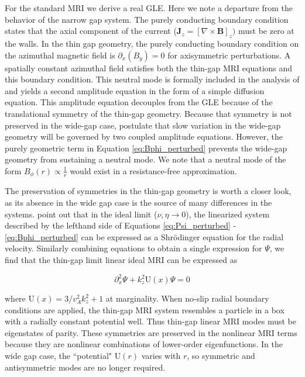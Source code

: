 \documentclass{emulateapj}
\newcommand{\beq}{\begin{equation}}
\newcommand{\eeq}{\end{equation}}
\newcommand{\citei}[1]{\citeauthor{#1} \citeyear{#1}}
\begin{document}
For the standard MRI we derive a real GLE. Here we note a departure from the behavior of the narrow gap system. The purely conducting boundary condition states that the axial component of the current ($\mathbf{J}_z = [\nabla \times \mathbf{B}]_z)$ must be zero at the walls. In the thin gap geometry, the purely conducting boundary condition on the azimuthal magnetic field is $\partial_x(B_y) = 0$ for axisymmetric perturbations. A spatially constant azimuthal field satisfies both the thin-gap MRI equations and this boundary condition. This neutral mode is formally included in the analysis of \citei{Umurhan:2007hs} and yields a second amplitude equation in the form of a simple diffusion equation. This amplitude equation decouples from the GLE because of the translational symmetry of the thin-gap geometry. Because that symmetry is not preserved in the wide-gap case, \citeauthor{Umurhan:2007hs} postulate that slow variation in the wide-gap geometry will be governed by two coupled amplitude equations. %
However, the purely geometric term in Equation \ref{eq:Bphi_perturbed} prevents the wide-gap geometry from sustaining a neutral mode. We note that a neutral mode of the form $B_\phi(r) \propto \frac{1}{r}$ would exist in a resistance-free approximation.

The preservation of symmetries in the thin-gap geometry is worth a closer look, as its absence in the wide gap case is the source of many differences in the systems. \citei{Latter:2015} point out that in the ideal limit ($\nu, \eta \rightarrow 0$), the linearized system described by the lefthand side of Equations \ref{eq:Psi_perturbed} - \ref{eq:Bphi_perturbed} can be expressed as a Shr{\"o}dinger equation for the radial velocity. Similarly combining equations to obtain a single expression for $\Psi$, we find that the thin-gap limit linear ideal MRI can be expressed as

\beq
\partial_x^2 \Psi + k_z^2 \mathrm{U}(x) \Psi = 0
\eeq 

where $\mathrm{U}(x) = {3}/{v_A^2 k_z^2} + 1$ at marginality. When no-slip radial boundary conditions are applied, the thin-gap MRI system resembles a particle in a box with a radially constant potential well. Thus thin-gap linear MRI modes must be eigenstates of parity. These symmetries are preserved in the nonlinear MRI terms because they are nonlinear combinations of lower-order eigenfunctions. In the wide gap case, the ``potential" $\mathrm{U}(r)$ varies with $r$, so symmetric and antisymmetric modes are no longer required.
\end{document}
